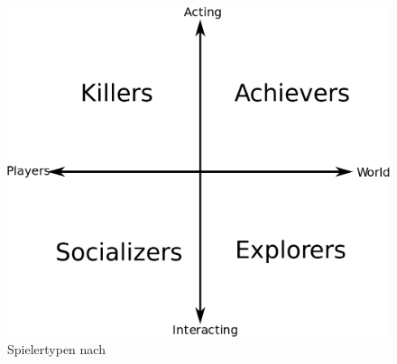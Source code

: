 \begin{figure}[H]
\begin{center}
\includegraphics[width=120mm]{images/ch4_img01_playertypes.png}
\caption{Spielertypen nach \textcite{Bartle.2004}}
\label{img:ch4_img01_playertypes}
\end{center}
\end{figure}

